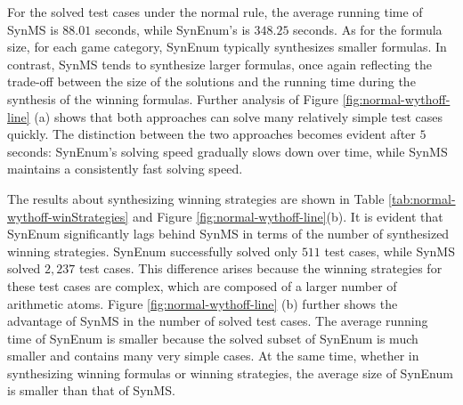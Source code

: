 \documentclass[review]{elsarticle}
\begin{document}
For the solved test cases under the normal rule, the average running time of SynMS is $88.01$ seconds, while SynEnum's is $348.25$ seconds. As for the formula size, for each game category, SynEnum typically synthesizes smaller formulas. In contrast, SynMS tends to synthesize larger formulas, once again reflecting the trade-off between the size of the solutions and the running time during the synthesis of the winning formulas. Further analysis of Figure \ref{fig:normal-wythoff-line} (a) shows that both approaches can solve many relatively simple test cases quickly. 
The distinction between the two approaches becomes evident after $5$ seconds: SynEnum's solving speed gradually slows down over time, while SynMS maintains a consistently fast solving speed. 

The results about synthesizing winning strategies are shown in
Table \ref{tab:normal-wythoff-winStrategies} and Figure \ref{fig:normal-wythoff-line}(b). 
It is evident that SynEnum significantly lags behind SynMS in terms of the number of synthesized winning strategies. SynEnum successfully solved only $511$ test cases, while SynMS solved $2,237$ test cases. This difference arises because the winning strategies for these test cases are complex, which are composed of a larger number of arithmetic atoms. Figure \ref{fig:normal-wythoff-line} (b) further shows the advantage of SynMS in the number of solved test cases. The average running time of SynEnum is smaller because the solved subset of SynEnum is much smaller and contains many very simple cases. At the same time, whether in synthesizing winning formulas or winning strategies, the average size of SynEnum is smaller than that of SynMS.
\end{document}
